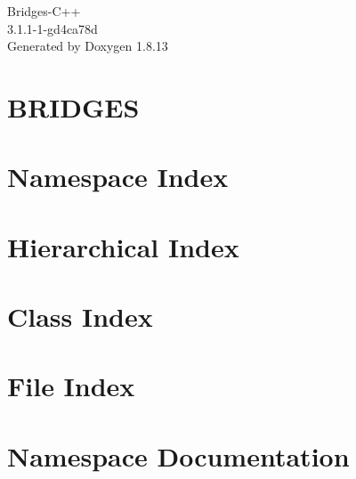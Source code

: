 \documentclass[twoside]{book}
\newcommand{\+}{\discretionary{\mbox{\scriptsize$\hookleftarrow$}}{}{}}
\newcommand{\clearemptydoublepage}{%
  \newpage{\pagestyle{empty}\cleardoublepage}%
}
\begin{document}
\hypersetup{pageanchor=false,
             bookmarksnumbered=true,
             pdfencoding=unicode
            }
\begin{titlepage}
\vspace*{7cm}
\begin{center}%
{\Large Bridges-\/\+C++ \\[1ex]\large 3.\+1.\+1-\/1-\/gd4ca78d }\\
\vspace*{1cm}
{\large Generated by Doxygen 1.8.13}\\
\end{center}
\end{titlepage}
\clearemptydoublepage
{}
\tableofcontents
\clearemptydoublepage
{}
\hypersetup{pageanchor=true}

\chapter{B\+R\+I\+D\+G\+ES}
\label{index}\hypertarget{index}{}
\chapter{Namespace Index}

\chapter{Hierarchical Index}

\chapter{Class Index}

\chapter{File Index}

\chapter{Namespace Documentation}







\end{document}
